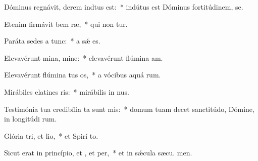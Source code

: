 \item Dóminus regnávit, derem indtus est:~* indútus est Dóminus fortitúdinem,   se.
\item Etenim firmávit bem ræ,~* qui non tur.
\item Paráta sedes a  tunc:~* a sǽ  es.
\item Elevavérunt mina, mine:~* elevavérunt flúmina  am.
\item Elevavérunt flúmina tus os,~* a vócibus aquá rum.
\item Mirábiles elatines ris:~* mirábilis in  nus.
\item Testimónia tua credibília ta sunt mis:~* domum tuam decet sanctitúdo, Dómine, in longitúdi rum.
\item Glória tri, et lio,~* et Spirí to.
\item Sicut erat in princípio, et , et per,~* et in sǽcula sæcu. men.
